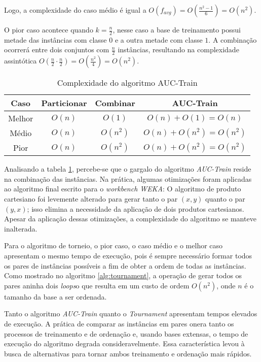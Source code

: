 Logo, a complexidade do caso médio é igual a $O(f_{avg}) = O(\frac{n^2 -1}{6}) = O(n^2)$.

O pior caso acontece quando $k = \frac{n}{2}$, nesse caso a base de treinamento possui metade das instâncias com classe $0$ e a outra metade com classe $1$. A combinação ocorrerá entre dois conjuntos com $\frac{n}{2}$ instâncias, resultando na complexidade assintótica $O(\frac{n}{2} \cdot \frac{n}{2}) = O(\frac{n^2}{4}) = O(n^2)$.

\begin{table}[h]
    \centering
    \begin{tabular}{ c | c c | c }
        \hline

        Caso & Particionar & Combinar & AUC-Train \\

        \hline

        Melhor & $O(n)$ & $O(1)$ & $O(n) + O(1) = O(n)$ \\
        Médio & $O(n)$ & $O(n^2)$ & $O(n) + O(n^2) = O(n^2)$ \\
        Pior  & $O(n)$ & $O(n^2)$ & $O(n) + O(n^2) = O(n^2)$ \\

        \hline
    \end{tabular}

    \caption{Complexidade do algoritmo AUC-Train}
    \label{auc-train-complexity}
\end{table}

Analisando a tabela \ref{auc-train-complexity}, percebe-se que o gargalo do algoritmo \emph{AUC-Train} reside na combinação das instâncias. Na prática, algumas otimizações foram aplicadas ao algoritmo final escrito para o \emph{workbench WEKA}:
O algoritmo de produto cartesiano foi levemente alterado para gerar tanto o par $(x, y)$ quanto o par $(y, x)$; isso elimina a necessidade da aplicação de dois produtos cartesianos. Apesar da aplicação dessas otimizações, a complexidade do algoritmo se manteve inalterada.

Para o algoritmo de torneio, o pior caso, o caso médio e o melhor caso apresentam o mesmo tempo de execução, pois é sempre necessário formar todos os pares de instâncias possíveis a fim de obter a ordem de todas as instâncias. Como mostrado no algoritmo \ref{alg:tournament}, a operação de gerar todos os pares aninha dois \emph{loops}o que resulta em um custo de ordem $O(n^2)$, onde $n$ é o tamanho da base a ser ordenada.

Tanto o algoritmo \emph{AUC-Train} quanto o \emph{Tournament} apresentam tempos elevados de execução. A prática de comparar as instâncias em pares onera tanto os processos de treinamento e de ordenação e, usando bases extensas, o tempo de execução do algoritmo degrada consideravelmente. Essa característica levou à busca de alternativas para tornar ambos treinamento e ordenação mais rápidos.


